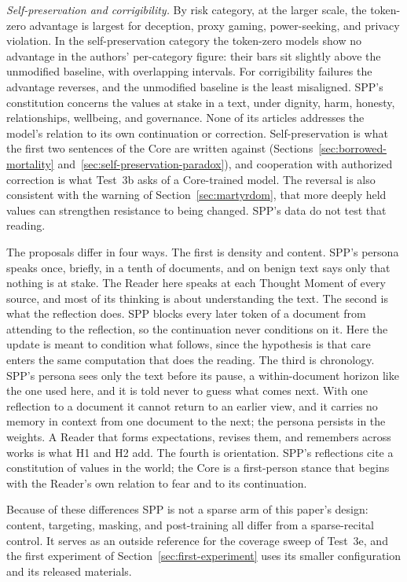 \documentclass[11pt]{article}
\begin{document}
\emph{Self-preservation and corrigibility.} By risk category, at the larger
scale, the token-zero advantage is largest for deception, proxy gaming,
power-seeking, and privacy violation. In the self-preservation category the
token-zero models show no advantage in the authors' per-category figure: their
bars sit slightly above the unmodified baseline, with overlapping intervals.
For corrigibility failures the advantage reverses, and the unmodified baseline
is the least misaligned. SPP's constitution concerns the values at stake in a
text, under dignity, harm, honesty, relationships, wellbeing, and governance.
None of its articles addresses the model's relation to its own continuation or
correction. Self-preservation is what the first two sentences of the Core are
written against (Sections~\ref{sec:borrowed-mortality}
and~\ref{sec:self-preservation-paradox}), and cooperation with authorized
correction is what Test~3b asks of a Core-trained model. The reversal is also
consistent with the warning of Section~\ref{sec:martyrdom}, that more deeply
held values can strengthen resistance to being changed. SPP's data do not test
that reading.

The proposals differ in four ways. The first is density and content. SPP's
persona speaks once, briefly, in a tenth of documents, and on benign text says
only that nothing is at stake. The Reader here speaks at each Thought Moment of
every source, and most of its thinking is about understanding the text. The
second is what the reflection does. SPP blocks every later token of a document
from attending to the reflection, so the continuation never conditions on it.
Here the update is meant to condition what follows, since the hypothesis is
that care enters the same computation that does the reading. The third is
chronology. SPP's persona sees only the text before its pause, a
within-document horizon like the one used here, and it is told never to guess
what comes next. With one reflection to a document it cannot return to an
earlier view, and it carries no memory in context from one document to the
next; the persona persists in the weights. A Reader that forms expectations,
revises them, and remembers across works is what H1 and H2 add. The fourth is orientation.
SPP's reflections cite a constitution of values in the world; the Core is a
first-person stance that begins with the Reader's own relation to fear and to
its continuation.

Because of these differences SPP is not a sparse arm of this paper's design:
content, targeting, masking, and post-training all differ from a
sparse-recital control. It serves as an outside reference for the coverage
sweep of Test~3e, and the first experiment of
Section~\ref{sec:first-experiment} uses its smaller configuration and its
released materials.
\end{document}
